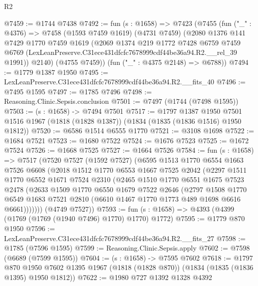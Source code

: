 \begin{lexlean}{R2}
\begin{coremodule}
@7459 := @1744 @7438
@7492 := fun (s : @1658) =>
  @7423
    (@7455
      (fun ("_" : @4376) =>
      @7458
        (@1593 @7459 @1619)
        (@4731 @7459)
        (@2080
          @1376
          @141
          @7429
          @1770
          @7459
          @1619
          (@2069
            @1374
            @219
            @1772
            @7428
            @6759
            @7459
            @6769
            (LexLeanPreserve.C31ece431dfcfc7678999cdf44be36a94.R2.__rel_39 @1991))
          @2140)
        (@4755 @7459))
      (fun ("_" : @4375 @2148) => @6788))
@7494 := @1779 @1387 @1950
@7495 := LexLeanPreserve.C31ece431dfcfc7678999cdf44be36a94.R2.__fits_40
@7496 := @7495 @1595
@7497 := @1785 @7496
@7498 := Reasoning.Clinic.Sepsis.conclusion
@7501 := @7497 (@1744 (@7498 @1595))
@7503 := (s : @1658) -> @7494 @7501
@7517 := @1797
    @1387
    @1950
    @7501
    @1516
    @1967
    (@1818 (@1828 @1387))
    (@1834 (@1835 (@1836 @1516) @1950 @1812))
@7520 := @6586 @1514 @6555 @1770
@7521 := @3108 @1698
@7522 := @1684 @7521
@7523 := @1680 @7522
@7524 := @1676 @7523
@7525 := @1672 @7524
@7526 := @1668 @7525
@7527 := @1664 @7526
@7584 := fun (s : @1658) =>
  @7517
    (@7520
      @7527
      (@1592 @7527)
      (@6595
        @1513
        @1770
        @6554
        @1663
        @7526
        @6608
        (@2018
          @1512
          @1770
          @6553
          @1667
          @7525
          @2042
          (@2297
            @1511
            @1770
            @6552
            @1671
            @7524
            @2310
            (@2465
              @1510
              @1770
              @6551
              @1675
              @7523
              @2478
              (@2633
                @1509
                @1770
                @6550
                @1679
                @7522
                @2646
                (@2797
                  @1508
                  @1770
                  @6549
                  @1683
                  @7521
                  @2810
                  (@6610 @1467 @1770 @1773 @489 @1698 @6616 @6661)))))))
      (@4749 @7527))
@7593 := fun (s : @1658) => @4393 (@4399 (@1769 (@1769 (@1940 @7496) @1770) @1770) @1772)
@7595 := @1779 @870 @1950
@7596 := LexLeanPreserve.C31ece431dfcfc7678999cdf44be36a94.R2.__fits_27
@7598 := @1785 (@7596 @1595)
@7599 := Reasoning.Clinic.Sepsis.apply
@7602 := @7598 (@6689 (@7599 @1595))
@7604 := (s : @1658) -> @7595 @7602
@7618 := @1797
    @870
    @1950
    @7602
    @1395
    @1967
    (@1818 (@1828 @870))
    (@1834 (@1835 (@1836 @1395) @1950 @1812))
@7622 := @1980 @727 @1392 @1328 @4392

\end{coremodule}
\end{lexlean}
